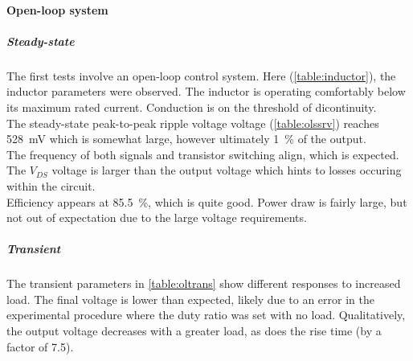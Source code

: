 \paragraph{Open-loop system}
\subparagraph{Steady-state}
The first tests involve an open-loop control system.
Here (\autoref{table:inductor}), the inductor
parameters were observed. The inductor is operating comfortably below
its maximum rated current. Conduction is on the threshold of dicontinuity.\\
The steady-state peak-to-peak ripple voltage voltage (\autoref{table:olssrv})
reaches \qty{528}{\mV} which is somewhat large, however ultimately \qty{1}{\percent} of the output.\\
The frequency of both signals and transistor switching align, which is expected.
The $V_{DS}$ voltage is larger than the output voltage which hints to losses occuring
within the circuit.\\
Efficiency appears at \qty{85.5}{\percent}, which is quite good. Power draw is fairly large, but not
out of expectation due to the large voltage requirements.
\subparagraph{Transient}
The transient parameters in \autoref{table:oltrans} show different responses to
increased load. The final voltage is lower than expected, likely due to an error in the
experimental procedure where the duty ratio was set with no load. Qualitatively, the output
voltage decreases with a greater load, as does the rise time (by a factor of 7.5).

